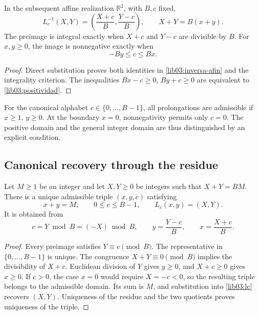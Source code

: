 \begin{proposition}
\label{lib03:prop-inversa}
In the subsequent affine realization \(\mathbb R^2\), with \(B,c\) fixed,
\begin{equation}
 L_c^{-1}(X,Y)=\left(\frac{X+c}{B},\frac{Y-c}{B}\right),\qquad
 X+Y=B(x+y).
 \label{lib03:inversa-afin}
\end{equation}
The preimage is integral exactly when \(X+c\) and \(Y-c\) are
divisible by \(B\). For \(x,y\geq0\), the image is nonnegative
exactly when
\begin{equation}
 -By\leq c\leq Bx.
 \label{lib03:positividad}
\end{equation}
\end{proposition}

\begin{proof}
Direct substitution proves both identities in
\eqref{lib03:inversa-afin} and the integrality criterion. The
inequalities \(Bx-c\geq0\), \(By+c\geq0\) are equivalent to
\eqref{lib03:positividad}.
\end{proof}

For the canonical alphabet \(c\in\{0,\ldots,B-1\}\), all
prolongations are admissible if \(x\geq1\), \(y\geq0\). At the
boundary \(x=0\), nonnegativity permits only \(c=0\).
The positive domain and the general integer domain are thus
distinguished by an explicit condition.

\subsection{Canonical recovery through the residue}
\label{lib03:residuo}

\begin{theorem}
\label{lib03:teo-residuo}
Let \(M\geq1\) be an integer and let \(X,Y\geq0\) be integers such that
\(X+Y=BM\). There is a unique admissible triple \((x,y,c)\) satisfying
\[
 x+y=M,\qquad 0\leq c\leq B-1,\qquad L_c(x,y)=(X,Y).
\]
It is obtained from
\begin{equation}
 c=Y\bmod B=(-X)\bmod B,\qquad
 y=\frac{Y-c}{B},\qquad x=\frac{X+c}{B}.
 \label{lib03:residuo-inversor}
\end{equation}
\end{theorem}

\begin{proof}
Every preimage satisfies \(Y\equiv c\pmod B\). The representative in
\(\{0,\ldots,B-1\}\) is unique. The congruence \(X+Y\equiv0\pmod B\)
implies the divisibility of \(X+c\). Euclidean division of \(Y\)
gives \(y\geq0\), and \(X+c\geq0\) gives \(x\geq0\). If
\(c>0\), the case \(x=0\) would require \(X=-c<0\), so the
resulting triple belongs to the admissible domain. Its sum is \(M\), and
substitution into \eqref{lib03:lc} recovers \((X,Y)\). Uniqueness
of the residue and the two quotients proves uniqueness of the triple.
\end{proof}

